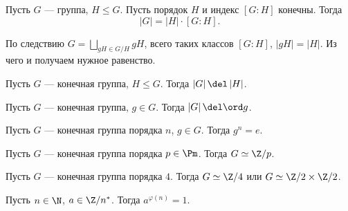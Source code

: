 \begin{thm}
    Пусть $ G$ --- группа, $ H \le G$. Пусть порядок $ H$ и индекс  $ [G: H]$ конечны. Тогда 
     \[
	 \left| G \right|  = \left| H \right| \cdot [G:H]
    .\] 
\end{thm}
\begin{myproof*}
    По следствию 
    $
    G = \bigsqcup_{gH \in  G/H} gH
    $, всего таких классов $ [G:H]$,  $ \left| gH \right| = | H |$. Из чего и получаем нужное равенство.

\end{myproof*}
\begin{cor}
    Пусть $ G$ ---  конечная группа,  $ H \le G$. Тогда $ \left| G \right| \del \left| H \right| $.
\end{cor}
\begin{cor}
    Пусть $ G$ ---  конечная группа,  $ g \in  G$. Тогда $ \left| G \right| \del \ord g $.
\end{cor}
\begin{cor}
    Пусть $ G$ ---  конечная группа порядка $ n$,  $ g \in  G$. Тогда $ g^{n} = e$.
\end{cor}
\begin{cor}
    Пусть $ G$ ---  конечная группа порядка $ p \in \Pm$. Тогда $ G \simeq \Z/p$.
\end{cor}
\begin{cor}
    Пусть $ G$ ---  конечная группа порядка $4$. Тогда $ G \simeq \Z/4 $ или $ G \simeq \Z / 2 \times  \Z / 2$.
\end{cor}
\begin{cor}
    Пусть $ n \in \N$, $ a \in \Z /n ^*$. Тогда $ a^{\varphi (n)} = 1$.
\end{cor}
% 
